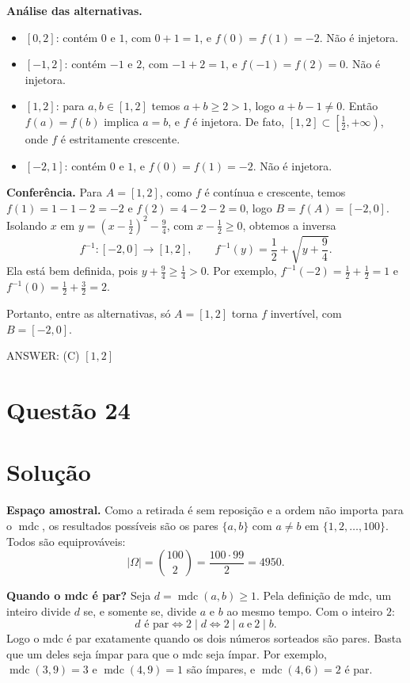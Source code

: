 \documentclass{article}%
\begin{document}
\textbf{Análise das alternativas.}
\begin{itemize}
\item[a)] $[0,2]$: contém $0$ e $1$, com $0+1=1$, e $f(0)=f(1)=-2$. Não é injetora.
\item[b)] $[-1,2]$: contém $-1$ e $2$, com $-1+2=1$, e $f(-1)=f(2)=0$. Não é injetora.
\item[c)] $[1,2]$: para $a,b\in[1,2]$ temos $a+b\ge 2>1$, logo $a+b-1\neq 0$. Então $f(a)=f(b)$ implica $a=b$, e $f$ é injetora. De fato, $[1,2]\subset\left[\tfrac12,+\infty\right)$, onde $f$ é estritamente crescente.
\item[d)] $[-2,1]$: contém $0$ e $1$, e $f(0)=f(1)=-2$. Não é injetora.
\end{itemize}

\textbf{Conferência.} Para $A=[1,2]$, como $f$ é contínua e crescente, temos $f(1)=1-1-2=-2$ e $f(2)=4-2-2=0$, logo $B=f(A)=[-2,0]$. Isolando $x$ em $y=\left(x-\tfrac12\right)^2-\tfrac94$, com $x-\tfrac12\ge 0$, obtemos a inversa
\[
f^{-1}:[-2,0]\to[1,2],\qquad f^{-1}(y)=\frac12+\sqrt{y+\frac94}.
\]
Ela está bem definida, pois $y+\tfrac94\ge \tfrac14>0$. Por exemplo, $f^{-1}(-2)=\tfrac12+\tfrac12=1$ e $f^{-1}(0)=\tfrac12+\tfrac32=2$.

Portanto, entre as alternativas, só $A=[1,2]$ torna $f$ invertível, com $B=[-2,0]$.

ANSWER: (C) $[1,2]$%
\newpage%
\section*{Questão 24}

\section*{Solução}

\textbf{Espaço amostral.} Como a retirada é sem reposição e a ordem não importa para o $\operatorname{mdc}$, os resultados possíveis são os pares $\{a,b\}$ com $a\neq b$ em $\{1,2,\dots,100\}$. Todos são equiprováveis:
\[
|\Omega|=\binom{100}{2}=\frac{100\cdot 99}{2}=4950 .
\]

\textbf{Quando o mdc é par?} Seja $d=\operatorname{mdc}(a,b)\geq 1$. Pela definição de mdc, um inteiro divide $d$ se, e somente se, divide $a$ e $b$ ao mesmo tempo. Com o inteiro $2$:
\[
d \text{ é par} \iff 2\mid d \iff 2\mid a \ \text{e}\ 2\mid b .
\]
Logo o mdc é par exatamente quando os dois números sorteados são pares. Basta que um deles seja ímpar para que o mdc seja ímpar. Por exemplo, $\operatorname{mdc}(3,9)=3$ e $\operatorname{mdc}(4,9)=1$ são ímpares, e $\operatorname{mdc}(4,6)=2$ é par.
\end{document}
